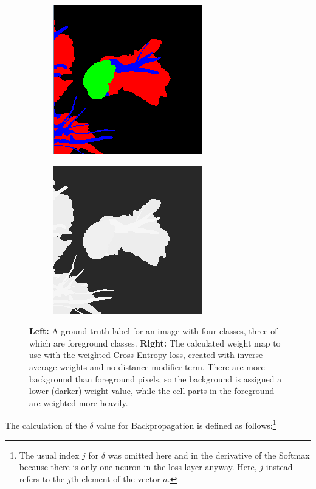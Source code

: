 \begin {figure}[!htb]
	\begin{center}
	\begin {subfigure}[b]{0.3\linewidth}
		\includegraphics{img/fig_weights_normal.png}
	\end {subfigure}\hspace{2.5cm}
	\begin {subfigure}[b]{0.3\linewidth}
		\includegraphics{img/fig_weights_weightmap.png}
	\end {subfigure}
	\end{center}

		\caption[The Cross-Entropy Loss weight map.]{\textbf{Left:} A ground truth label for an image with four classes, three of which are foreground classes. \textbf{Right:} The calculated weight map to use with the weighted Cross-Entropy loss, created with inverse average weights and no distance modifier term. There are more background than foreground pixels, so the background is assigned a lower (darker) weight value, while the cell parts in the foreground are weighted more heavily.}
		\label{fig:weight_map}

\end {figure}

\noindent The calculation of the $\delta$ value for Backpropagation is defined as follows:\footnote{The usual index $j$ for $\delta$ was omitted here and in the derivative of the Softmax because there is only one neuron in the loss layer anyway. Here, $j$ instead refers to the $j$th element of the vector $a$.}


